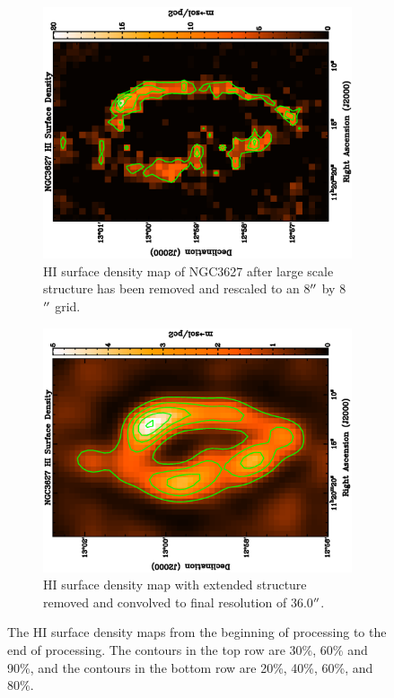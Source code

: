 \begin{figure}
  \begin{subfigure}[t]{.45\textwidth}
    \centering
    \includegraphics[width=1.\textwidth,angle=270]{obs_imgs/HI_rem.eps}
    \caption{HI surface density map of NGC3627 after large scale structure has been removed and rescaled to an 8$\mbox{$^{\prime\prime}$}$ by 8$\mbox{$^{\prime\prime}$}$ grid.}
  \end{subfigure}%
  \quad
  \begin{subfigure}[t]{0.45\textwidth}
    \centering
    \includegraphics[width=1.\textwidth,angle=270]{obs_imgs/HI_use.eps}
    \caption[100$\mu$m Filtering Steps]{HI surface density map with extended structure removed and convolved to final resolution of 36.0$\mbox{$^{\prime\prime}$}$.}
  \end{subfigure}
  \caption[HI surface density filtering Steps]{The HI surface density maps from the beginning of processing to the end of processing.  The contours in the top row are 30\%, 60\% and 90\%, and the contours in the bottom row are 20\%, 40\%, 60\%, and 80\%.}
  \label{fig_HI_transform}
\end{figure}
 
